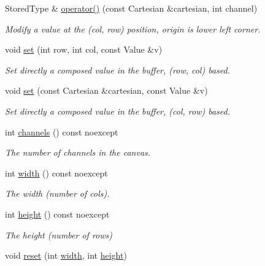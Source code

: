 \begin{DoxyCompactItemize}
Stored\+Type \& \mbox{\hyperlink{classrayt_1_1_buffer_ab262e04b68ac078bbd8cca4fe6f0f5a3}{operator()}} (const Cartesian \&cartesian, int channel)
\begin{DoxyCompactList}\small\item\em Modify a value at the (col, row) position, origin is lower left corner. \end{DoxyCompactList}\item 
void \mbox{\hyperlink{classrayt_1_1_buffer_ae41a09f4b386e06e73c0da5fa47e7535}{set}} (int row, int col, const Value \&v)
\begin{DoxyCompactList}\small\item\em Set directly a composed value in the buffer, (row, col) based. \end{DoxyCompactList}\item 
void \mbox{\hyperlink{classrayt_1_1_buffer_a3253e5e62b54e4787dd773ba7b897980}{set}} (const Cartesian \&cartesian, const Value \&v)
\begin{DoxyCompactList}\small\item\em Set directly a composed value in the buffer, (col, row) based. \end{DoxyCompactList}\item 
int \mbox{\hyperlink{classrayt_1_1_buffer_acb80ea36f8563bfa775eb9a23d316e32}{channels}} () const noexcept
\begin{DoxyCompactList}\small\item\em The number of channels in the canvas. \end{DoxyCompactList}\item 
int \mbox{\hyperlink{classrayt_1_1_buffer_a905edf4ca7a7b88dc2d3dddf7d3b50b6}{width}} () const noexcept
\begin{DoxyCompactList}\small\item\em The width (number of cols). \end{DoxyCompactList}\item 
int \mbox{\hyperlink{classrayt_1_1_buffer_a575f281f1549488685df3b0a61489de9}{height}} () const noexcept
\begin{DoxyCompactList}\small\item\em The height (number of rows) \end{DoxyCompactList}\item 
void \mbox{\hyperlink{classrayt_1_1_buffer_a674041ad7b285bf2418b75b7653ded36}{reset}} (int \mbox{\hyperlink{classrayt_1_1_buffer_a905edf4ca7a7b88dc2d3dddf7d3b50b6}{width}}, int \mbox{\hyperlink{classrayt_1_1_buffer_a575f281f1549488685df3b0a61489de9}{height}})

\end{DoxyCompactItemize}
